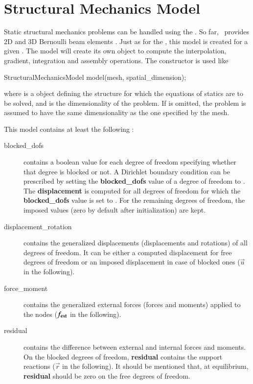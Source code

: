 \chapter{Structural  Mechanics   Model}
Static structural mechanics problems can be handled using the
.  So far, \akantu\ provides 2D and 3D
Bernoulli beam elements \cite{frey2009}.  Just as for the
, this model is created for a given
.  The model will create its own  object to
compute the interpolation, gradient, integration and assembly
operations.  The  constructor is used
like

\begin{cpp}
  StructuralMechanicsModel model(mesh, spatial_dimension);
\end{cpp}
where  is a  object defining the structure for
which the equations of statics are to be solved, and
 is the dimensionality of the problem.  If
 is omitted, the problem is assumed to have
the same dimensionality as the one specified by the mesh.



\vspace{1cm}
This model contains at least the following :
\begin{description}
\item[blocked\_dofs] contains a boolean value for each degree of
  freedom specifying whether that degree is blocked or not. A
  Dirichlet boundary condition can be prescribed by setting the
  \textbf{blocked\_dofs} value of a degree of freedom to
  . The \textbf{displacement} is computed for all degrees
  of freedom for which the \textbf{blocked\_dofs} value is set to
  . For the remaining degrees of freedom, the imposed
  values (zero by default after initialization) are kept.



\item[displacement\_rotation] contains the generalized displacements
  (displacements and rotations) of all degrees of freedom. It can be
  either a computed displacement for free degrees of freedom or an
  imposed displacement in case of blocked ones ($\vec{u}$ in the
  following).

\item[force\_moment] contains the generalized external forces (forces
  and moments) applied to the nodes ($\boldsymbol{f_{{\mathrm{ext}}}}$ in the
  following).

\item[residual] contains the difference between external and internal
  forces and moments. On the blocked degrees of freedom,
  \textbf{residual} contains the support reactions ($\vec{r}$ in the
  following).  It should be mentioned that, at equilibrium,
  \textbf{residual} should be zero on the free degrees of freedom.
\end{description}

